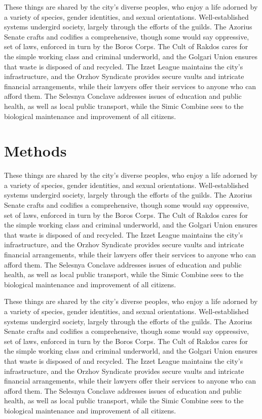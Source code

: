 These things are shared by the city's diverse peoples, who enjoy a life adorned
by a variety of  species, gender identities, and sexual orientations.
Well-established systems undergird society, largely through the efforts of the
guilds. The Azorius Senate crafts and codifies a comprehensive, though some
would say oppressive, set of laws, enforced in turn by the Boros Corps. The Cult
of Rakdos cares for the simple working class and criminal underworld, and the
Golgari Union ensures that waste is disposed of and recycled. The Izzet League
maintains the city's infrastructure, and the Orzhov Syndicate provides secure
vaults and intricate financial arrangements, while their lawyers offer their
services to anyone who can afford them. The Selesnya Conclave addresses issues
of education and public health, as well as local public transport, while the
Simic Combine sees to the biological maintenance and improvement of all
citizens.

\chapter{Methods}
These things are shared by the city's diverse peoples, who enjoy a life adorned
by a variety of  species, gender identities, and sexual orientations.
Well-established systems undergird society, largely through the efforts of the
guilds. The Azorius Senate crafts and codifies a comprehensive, though some
would say oppressive, set of laws, enforced in turn by the Boros Corps. The Cult
of Rakdos cares for the simple working class and criminal underworld, and the
Golgari Union ensures that waste is disposed of and recycled. The Izzet League
maintains the city's infrastructure, and the Orzhov Syndicate provides secure
vaults and intricate financial arrangements, while their lawyers offer their
services to anyone who can afford them. The Selesnya Conclave addresses issues
of education and public health, as well as local public transport, while the
Simic Combine sees to the biological maintenance and improvement of all
citizens. 

These things are shared by the city's diverse peoples, who enjoy a life adorned
by a variety of  species, gender identities, and sexual orientations.
Well-established systems undergird society, largely through the efforts of the
guilds. The Azorius Senate crafts and codifies a comprehensive, though some
would say oppressive, set of laws, enforced in turn by the Boros Corps. The Cult
of Rakdos cares for the simple working class and criminal underworld, and the
Golgari Union ensures that waste is disposed of and recycled. The Izzet League
maintains the city's infrastructure, and the Orzhov Syndicate provides secure
vaults and intricate financial arrangements, while their lawyers offer their
services to anyone who can afford them. The Selesnya Conclave addresses issues
of education and public health, as well as local public transport, while the
Simic Combine sees to the biological maintenance and improvement of all
citizens.


